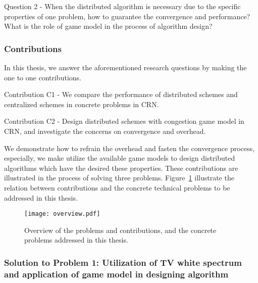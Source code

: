 Question 2 - When the distributed algorithm is necessary due to the specific properties of one problem, how to guarantee the convergence and performance? What is the role of game model in the process of algorithm design?

%
%



\subsubsection{Contributions}
In this thesis, we answer the aforementioned research questions by making the one to one contributions.

Contribution C1 - We compare the performance of distributed schemes and centralized schemes in concrete problems in CRN.

Contribution C2 - Design distributed schemes with congestion game model in CRN, and investigate the concerns on convergence and overhead.

We demonstrate how to refrain the overhead and fasten the convergence process, especially, we make utilize the available game models to design distributed algorithms which have the desired these properties.
These contributions are illustrated in the process of solving three problems.
Figure~\ref{overview} illustrate the relation between contributions and the concrete technical problems to be addressed in this thesis.
\begin{figure}[h!]
  \centering
  \texttt{[image: overview.pdf]}
  \caption{Overview of the problems and contributions, and the concrete problems addressed in this thesis.}
\label{overview}
\end{figure}


\subsubsection{Solution to Problem 1: Utilization of TV white spectrum and application of game model in designing algorithm}

